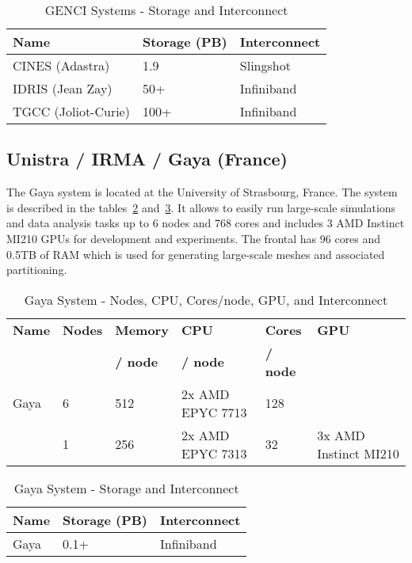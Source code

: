     \begin{table}[!ht]
        \centering
        \begin{tabular}{l l l}
        \toprule
        \textbf{Name} & \textbf{Storage (PB)} & \textbf{Interconnect} \\
        \midrule
        CINES (Adastra) & 1.9 & Slingshot \\
        IDRIS (Jean Zay) & 50+ & Infiniband \\
        TGCC (Joliot-Curie) & 100+ & Infiniband \\
        \bottomrule
        \end{tabular}
        \caption{GENCI Systems - Storage and Interconnect}
        \label{tab:genci_storage_interconnect}
    \end{table}

\subsection*{Unistra / IRMA / Gaya (France)}
\label{sec:arch:gaya}

The Gaya system is located at the University of Strasbourg, France. The system is described in the tables~\ref{tab:gaya_flops_cpu_gpu} and~\ref{tab:gaya_storage_interconnect}. It allows to easily run large-scale simulations and data analysis tasks up to 6 nodes and 768 cores and includes 3 AMD Instinct MI210 GPUs for development and experiments.
The frontal has 96 cores and 0.5TB of RAM which is used for generating large-scale meshes and associated partitioning.

\begin{table}[!ht]
    \centering
    \begin{tabular}{l l l l l l}
    \toprule
    \textbf{Name} & \textbf{Nodes} & \textbf{Memory} & \textbf{CPU} & \textbf{Cores} & \textbf{GPU} \\
    &  & \textbf{/ node} & \textbf{/ node}  & \textbf{/ node} &  \\
    \midrule
    Gaya &  6  & 512 & 2x AMD EPYC 7713 & 128 &  \\
         &  1 & 256 & 2x AMD EPYC 7313 & 32 & 3x AMD Instinct MI210 \\
    \bottomrule
    \end{tabular}
    \caption{Gaya System - Nodes, CPU, Cores/node, GPU, and Interconnect}
    \label{tab:gaya_flops_cpu_gpu}
\end{table}

    \begin{table}[!ht]
        \centering
        \begin{tabular}{l l l}
        \toprule
        \textbf{Name} & \textbf{Storage (PB)} & \textbf{Interconnect} \\
        \midrule
        Gaya & 0.1+ & Infiniband \\
        \bottomrule
    \end{tabular}
    \caption{Gaya System - Storage and Interconnect}
    \label{tab:gaya_storage_interconnect}
    \end{table}

